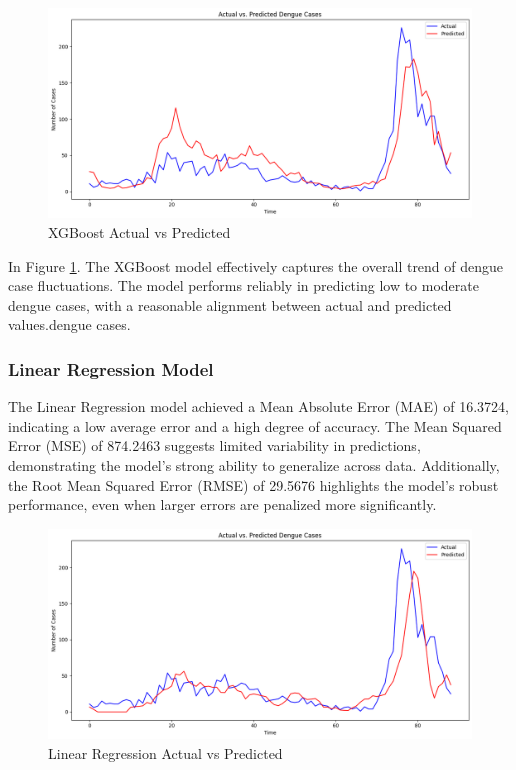 \documentclass{article}
\begin{document}
\begin{figure}[h!]
    \centering
    \includegraphics[width=1\linewidth]{image/XGBoost plot.png}
    \caption{XGBoost Actual vs Predicted}
    \label{fig:xgb}
\end{figure}

In Figure \ref{fig:xgb}. The XGBoost model effectively captures the overall trend of dengue case fluctuations. The model performs reliably in predicting low to moderate dengue cases, with a reasonable alignment between actual and predicted values.dengue cases.

\subsubsection{Linear Regression Model}
The Linear Regression model achieved a Mean Absolute Error (MAE) of 16.3724, indicating a low average error and a high degree of accuracy. The Mean Squared Error (MSE) of 874.2463 suggests limited variability in predictions, demonstrating the model's strong ability to generalize across data. Additionally, the Root Mean Squared Error (RMSE) of 29.5676 highlights the model's robust performance, even when larger errors are penalized more significantly.

\begin{figure}[h!]
    \centering
    \includegraphics[width=1\linewidth]{image/Linear Regression plot.png}
    \caption{Linear Regression Actual vs Predicted}
    \label{fig:lr}
\end{figure}
\end{document}
